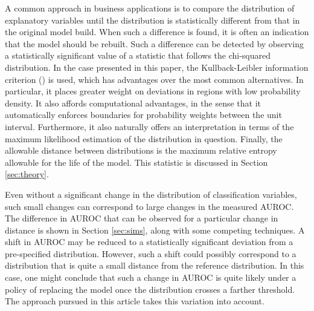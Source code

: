 A common approach in business applications is to compare the distribution of explanatory variables until the distribution is statistically different from that in the original model build.
When such a difference is found, it is often an indication that the model should be rebuilt.
Such a difference can be detected by observing a statistically significant value of a statistic that follows the chi-squared distribution.
In the case presented in this paper, the Kullback-Leibler information criterion (\citet{kullbackliebler1951}) is used, which has advantages over the most common alternatives.
In particular, it places greater weight on deviations in regions with low probability density.
It also affords computational advantages, in the sense that it automatically enforces boundaries for probability weights between the unit interval.
Furthermore, it also naturally offers an interpretation in terms of the maximum likelihood estimation of the distribution in question. 
Finally, the allowable distance between distributions is the maximum relative entropy allowable for the life of the model. 
This statistic is discussed in Section \ref{sec:theory}.


Even without a significant change in the distribution of classification variables, such small changes can correspond to large changes in the measured AUROC.
The difference in AUROC that can be observed for a particular change in distance is shown in Section \ref{sec:sims}, along with some competing techniques.
A shift in AUROC may be reduced to a statistically significant
deviation from a pre-specified distribution.
However, such a shift could possibly correspond to a distribution that is quite a small distance from the reference distribution.
In this case, one might conclude that such a change in AUROC is quite likely under a policy of replacing the model once the distribution crosses a farther threshold.
The approach pursued in this article takes this variation into account.



